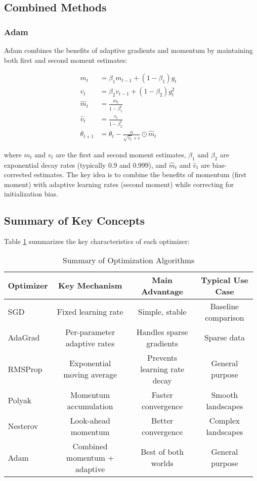 \documentclass[12pt]{article}
\begin{document}
\subsection{Combined Methods}

\subsubsection{Adam}

Adam combines the benefits of adaptive gradients and momentum by maintaining both first and second moment estimates:

\begin{align}
m_t &= \beta_1 m_{t-1} + (1-\beta_1) g_t \\
v_t &= \beta_2 v_{t-1} + (1-\beta_2) g_t^2 \\
\hat{m}_t &= \frac{m_t}{1-\beta_1^t} \\
\hat{v}_t &= \frac{v_t}{1-\beta_2^t} \\
\theta_{t+1} &= \theta_t - \frac{\alpha}{\sqrt{\hat{v}_t} + \epsilon} \odot \hat{m}_t
\end{align}

where $m_t$ and $v_t$ are the first and second moment estimates, $\beta_1$ and $\beta_2$ are exponential decay rates (typically 0.9 and 0.999), and $\hat{m}_t$ and $\hat{v}_t$ are bias-corrected estimates. The key idea is to combine the benefits of momentum (first moment) with adaptive learning rates (second moment) while correcting for initialization bias.

\subsection{Summary of Key Concepts}

Table \ref{tab:optimizer_summary} summarizes the key characteristics of each optimizer:

\begin{table}[H]
\centering
\caption{Summary of Optimization Algorithms}
\label{tab:optimizer_summary}
\begin{tabular}{|l|c|c|c|}
\hline
\textbf{Optimizer} & \textbf{Key Mechanism} & \textbf{Main Advantage} & \textbf{Typical Use Case} \\
\hline
SGD & Fixed learning rate & Simple, stable & Baseline comparison \\
\hline
AdaGrad & Per-parameter adaptive rates & Handles sparse gradients & Sparse data \\
\hline
RMSProp & Exponential moving average & Prevents learning rate decay & General purpose \\
\hline
Polyak & Momentum accumulation & Faster convergence & Smooth landscapes \\
\hline
Nesterov & Look-ahead momentum & Better convergence & Complex landscapes \\
\hline
Adam & Combined momentum + adaptive & Best of both worlds & General purpose \\
\hline
\end{tabular}
\end{table}
\end{document}
